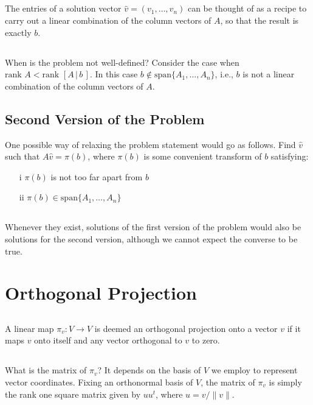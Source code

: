 \documentclass{proc-l}
\theoremstyle{definition}
\theoremstyle{remark}
\numberwithin{equation}{section}
\newcommand{\rank}[1]{\textrm{rank } {#1}}
\begin{document}
\subsection{}
The entries of a solution vector $\hat{v} = (v_1, \ldots, v_n)$ can be thought of as a recipe to carry out a linear combination of the column vectors of $A$, so that the result is exactly $b$.

\subsection{}
When is the problem not well-defined? Consider the case when $\rank{A} < \rank{[A\,|\,b\,]}$. In this case $b\notin\textrm{span}\{A_1,\ldots,A_n\}$, i.e., $b$ is not a linear combination of the column vectors of $A$.

\subsection{Second Version of the Problem}\label{transform}
One possible way of relaxing the problem statement would go as follows. Find $\hat v$ such that $A\hat v = \pi(b)$, where $\pi(b)$ is some convenient transform of $b$ satisfying:
\begin{itemize}
\item[i] $\pi(b)$ is not too far apart from $b$
\item[ii] $\pi(b)\in\textrm{span}\{A_1,\ldots,A_n\}$
\end{itemize}

\subsection{}
Whenever they exist, solutions of the first version of the problem would also be solutions for the second version, although we cannot expect the converse to be true.

\section{Orthogonal Projection}

\subsection{}
A linear map $\pi_v: V\to V$ is deemed an orthogonal projection onto a vector $v$ if it maps $v$ onto itself and any vector orthogonal to $v$ to zero.

\subsection{}
What is the matrix of $\pi_v$? It depends on the basis of $V$ we employ to represent vector coordinates. Fixing an orthonormal basis of $V$, the matrix of $\pi_v$ is simply the rank one square matrix given by $u u^t$, where $u=v/\|v\|$.
\end{document}
